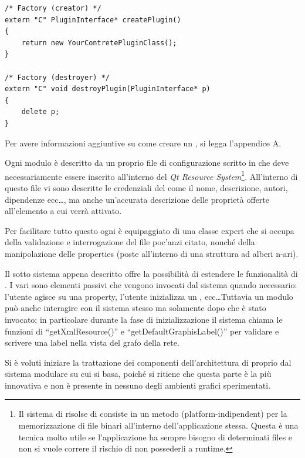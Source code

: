 \begin{lstlisting}
/* Factory (creator) */
extern "C" PluginInterface* createPlugin()
{
	return new YourContretePluginClass();
}

/* Factory (destroyer) */
extern "C" void destroyPlugin(PluginInterface* p)
{
	delete p;
}
\end{lstlisting}
Per avere informazioni aggiuntive su come creare un \plugin{}, si legga l'appendice A.

Ogni modulo è descritto da un proprio file di configurazione scritto in \xml{} che deve necessariamente essere inserito all'interno del \emph{Qt Resource System}\footnote{Il sistema di risolse di \qt{} consiste in un metodo (platform-indipendent) per la memorizzazione di file binari all'interno dell'applicazione stessa. Questa è una tecnica molto utile se l'applicazione ha sempre bisogno di determinati files e non si vuole correre il rischio di non possederli a runtime.}. All'interno di questo file vi sono descritte le credenziali del \plugin{} come il nome, descrizione, autori, dipendenze ecc\ldots, ma anche un'accurata descrizione delle proprietà offerte all'elemento a cui verrà attivato.

Per facilitare tutto questo ogni \proxy{} è equipaggiato di una classe expert che si occupa della validazione e interrogazione del file \xml{} poc'anzi citato, nonché della manipolazione delle properties (poste all'interno di una struttura ad alberi n-ari).

Il sotto sistema appena descritto offre la possibilità di estendere le funzionalità di \visualnetkit{}. I vari \plugin{} sono elementi passivi che vengono invocati dal sistema quando necessario: l'utente agisce su una property, l'utente inizializza un \plugin{}, ecc\ldots Tuttavia un modulo può anche interagire con il sistema stesso ma solamente dopo che è stato invocato; in particolare durante la fase di inizializzazione il sistema chiama le funzioni di ``getXmlResource()'' e ``getDefaultGraphisLabel()'' per validare e scrivere una label nella vista del grafo della rete.

Si è voluti iniziare la trattazione dei componenti dell'architettura di \visualnetkit{} proprio dal sistema modulare su cui si basa, poiché si ritiene che questa parte è la più innovativa e non è presente in nessuno degli ambienti grafici sperimentati.

